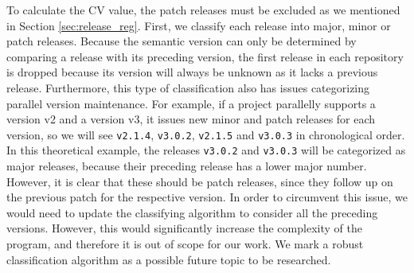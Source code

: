 To calculate the CV value, the patch releases must be excluded as we mentioned in Section \ref{sec:release_reg}. First, we classify each release into major, minor or patch releases. Because the semantic version can only be determined by comparing a release with its preceding version, the first release in each repository is dropped because its version will always be unknown as it lacks a previous release. Furthermore, this type of classification also has issues categorizing parallel version maintenance. For example, if a project parallelly supports a version v2 and a version v3, it issues new minor and patch releases for each version, so we will see \texttt{v2.1.4}, \texttt{v3.0.2}, \texttt{v2.1.5} and \texttt{v3.0.3} in chronological order. In this theoretical example, the releases \texttt{v3.0.2} and \texttt{v3.0.3} will be categorized as major releases, because their preceding release has a lower major number. However, it is clear that these should be patch releases, since they follow up on the previous patch for the respective version. In order to circumvent this issue, we would need to update the classifying algorithm to consider all the preceding versions. However, this would significantly increase the complexity of the program, and therefore it is out of scope for our work. We mark a robust classification algorithm as a possible future topic to be researched.

